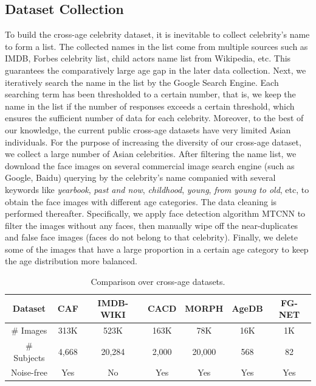 \documentclass[runningheads]{llncs}
\begin{document}
\subsection{Dataset Collection}
To build the cross-age celebrity dataset, it is inevitable to collect celebrity's name to form a list. The collected names in the list come from multiple sources such as IMDB, Forbes celebrity list, child actors name list from Wikipedia, etc. This guarantees the comparatively large age gap in the later data collection. Next, we iteratively search the name in the list by the Google Search Engine. Each searching term has been thresholded to a certain number, that is, we keep the name in the list if the number of responses exceeds a certain threshold, which ensures the sufficient number of data for each celebrity. Moreover, to the best of our knowledge, the current public cross-age datasets have very limited Asian individuals. For the purpose of increasing the diversity of our cross-age dataset, we collect a large number of Asian celebrities. After filtering the name list, we download the face images on several commercial image search engine (such as Google, Baidu) querying by the celebrity's name companied with several keywords like \emph{yearbook}, \emph{past and now}, \emph{childhood}, \emph{young}, \emph{from young to old}, etc, to obtain the face images with different age categories. The data cleaning is performed thereafter. Specifically, we apply face detection algorithm MTCNN \cite{mtcnn} to filter the images without any faces, then manually wipe off the near-duplicates and false face images (faces do not belong to that celebrity). Finally, we delete some of the images that have a large proportion in a certain age category to keep the age distribution more balanced.

\begin{table}[t]
\begin{center}
\begin{tabular}{|c|c|c|c|c|c|c|}
\hline
Dataset 	& CAF 	& IMDB-WIKI	\cite{imdb2} & CACD \cite{cacd} 		& MORPH \cite{morph}   & AgeDB \cite{agedb} & FG-NET \cite{fgnet}			\\
\hline\hline
\# Images 	& 313K 		& 523K	 	& 163K 		& 78K &	16K		& 1K 				\\
\# Subjects & 4,668		& 20,284 	& 2,000		& 20,000&	568	& 82				\\
Noise-free	& Yes		& No     		& Yes		& Yes	&	Yes	& Yes				\\
\hline
\end{tabular}
\end{center}
\caption{Comparison over cross-age datasets.}
\label{dataset_comp}
\end{table}
\end{document}

